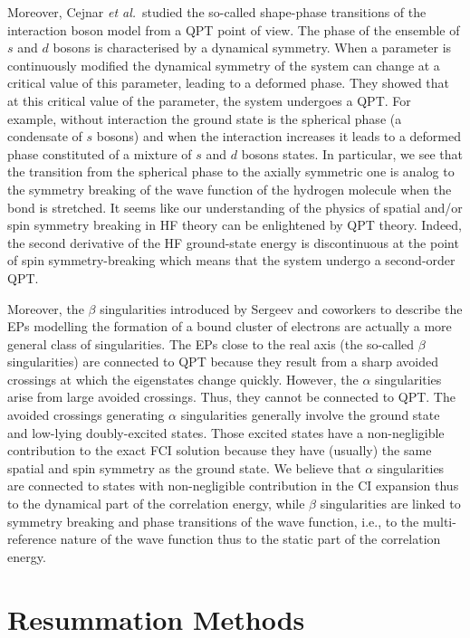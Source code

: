 \documentclass[aps,prb,reprint,noshowkeys,linenumbers,superscriptaddress]{revtex4-1}
\newcommand{\latin}[1]{#1}
\newcommand{\ie}{\latin{i.e.}}
\begin{document}
Moreover, Cejnar \textit{et al.}~studied the so-called shape-phase transitions of the interaction boson model from a QPT point of view. \cite{Cejnar_2000, Cejnar_2003, Cejnar_2007a, Cejnar_2009}
The phase of the ensemble of $s$ and $d$ bosons is characterised by a dynamical symmetry. 
When a parameter is continuously modified the dynamical symmetry of the system can change at a critical value of this parameter, leading to a deformed phase. 
They showed that at this critical value of the parameter, the system undergoes a QPT. 
For example, without interaction the ground state is the spherical phase (a condensate of $s$ bosons) and when the interaction increases it leads to a deformed phase constituted of a mixture of $s$ and $d$ bosons states. 
In particular, we see that the transition from the spherical phase to the axially symmetric one is analog to the symmetry breaking of the wave function of the hydrogen molecule when the bond is stretched. \cite{SzaboBook}
It seems like our understanding of the physics of spatial and/or spin symmetry breaking in HF theory can be enlightened by QPT theory. 
Indeed, the second derivative of the HF ground-state energy is discontinuous at the point of spin symmetry-breaking which means that the system undergo a second-order QPT. 

Moreover, the $\beta$ singularities introduced by Sergeev and coworkers to describe the EPs modelling the formation of a bound cluster of electrons are actually a more general class of singularities. 
The EPs close to the real axis (the so-called $\beta$ singularities) are connected to QPT because they result from a sharp avoided crossings at which the eigenstates change quickly. 
However, the $\alpha$ singularities arise from large avoided crossings. 
Thus, they cannot be connected to QPT. 
The avoided crossings generating $\alpha$ singularities generally involve the ground state and low-lying doubly-excited states. 
Those excited states have a non-negligible contribution to the exact FCI solution because they have (usually) the same spatial and spin symmetry as the ground state. 
We believe that $\alpha$ singularities are connected to states with non-negligible contribution in the CI expansion thus to the dynamical part of the correlation energy, while $\beta$ singularities are linked to symmetry breaking and phase transitions of the wave function, \ie, to the multi-reference nature of the wave function thus to the static part of the correlation energy.

\section{Resummation Methods}
\label{sec:Resummation}
\end{document}
